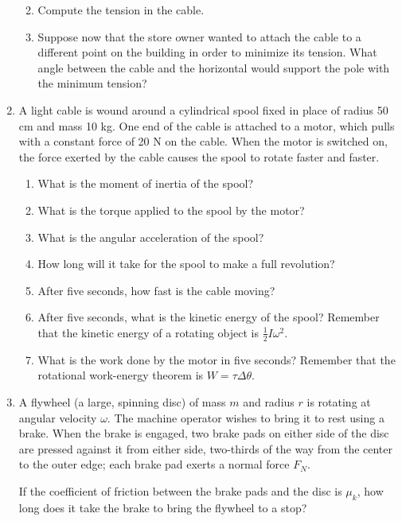 \documentclass[12pt]{article}
\begin{document}
\begin{enumerate}
\begin{enumerate}
\bigskip

\item Compute the tension in the cable.

\vspace{2 in}

\item Suppose now that the store owner wanted to attach the cable to a different point on the building in order to minimize its tension. What angle between the
cable and the horizontal would support the pole with the minimum tension?
\end{enumerate}
\newpage


  \item{A light cable is wound around a cylindrical spool fixed in place of radius 50 cm and mass 10 kg. One end of the cable is attached to a motor, which pulls with a constant force of 20 N on the cable. When the motor is switched on, the force exerted by the cable causes the spool to rotate faster and faster.}
    \begin{enumerate}
      \item{What is the moment of inertia of the spool?}
\vspace{0.9in}
      \item{What is the torque applied to the spool by the motor?}
\vspace{0.9in}
      \item{What is the angular acceleration of the spool?}
\vspace{0.9in}
      \item{How long will it take for the spool to make a full revolution?}
\vspace{0.9in}
      \item{After five seconds, how fast is the cable moving?}
\vspace{0.9in}
      \item{After five seconds, what is the kinetic energy of the spool? Remember that the kinetic energy
of a rotating object is $\frac{1}{2}I\omega^2$.}
\vspace{0.9in}
      \item{What is the work done by the motor in five seconds? Remember that the rotational work-energy
theorem is $W=\tau \Delta \theta$.}
\vspace{0.9in}
     \end{enumerate}

\newpage

\item A flywheel (a large, spinning disc) of mass $m$ and radius $r$ is rotating
at angular velocity $\omega$. The machine operator wishes to bring it to rest using a brake. When the brake 
is engaged, two brake pads on either side of the disc are pressed against it from either side, two-thirds
of the way from the center to the outer edge; each brake pad
exerts a normal force $F_N$. 

If the coefficient of friction between the brake pads and the disc is $\mu_k$, how long does it take the
brake to bring the flywheel to a stop?


     \end{enumerate}
\end{document}
